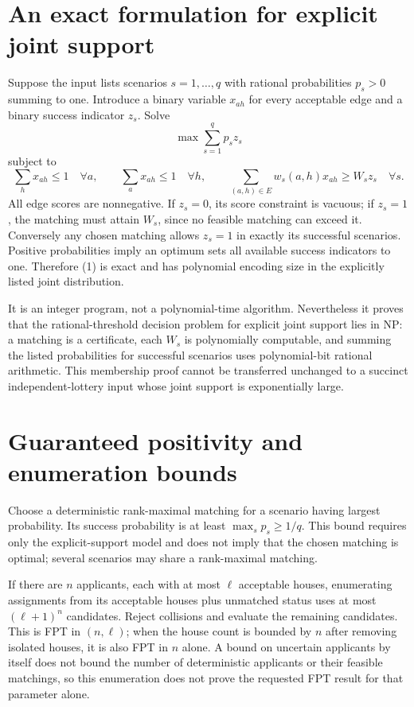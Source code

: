 \documentclass[11pt]{article}
\begin{document}
\section*{An exact formulation for explicit joint support}
Suppose the input lists scenarios $s=1,\ldots,q$ with rational probabilities $p_s>0$ summing to one. Introduce a binary variable $x_{ah}$ for every acceptable edge and a binary success indicator $z_s$. Solve
\[
 \max\sum_{s=1}^q p_sz_s
\]
subject to
\[
 \sum_hx_{ah}\leq1\quad\forall a,\qquad
 \sum_ax_{ah}\leq1\quad\forall h,\qquad
 \sum_{(a,h)\in E}w_s(a,h)x_{ah}\geq W_sz_s\quad\forall s.
                                                               \tag{1}
\]
All edge scores are nonnegative. If $z_s=0$, its score constraint is vacuous; if $z_s=1$, the matching must attain $W_s$, since no feasible matching can exceed it. Conversely any chosen matching allows $z_s=1$ in exactly its successful scenarios. Positive probabilities imply an optimum sets all available success indicators to one. Therefore (1) is exact and has polynomial encoding size in the explicitly listed joint distribution.

It is an integer program, not a polynomial-time algorithm. Nevertheless it proves that the rational-threshold decision problem for explicit joint support lies in NP: a matching is a certificate, each $W_s$ is polynomially computable, and summing the listed probabilities for successful scenarios uses polynomial-bit rational arithmetic. This membership proof cannot be transferred unchanged to a succinct independent-lottery input whose joint support is exponentially large.

\section*{Guaranteed positivity and enumeration bounds}
Choose a deterministic rank-maximal matching for a scenario having largest probability. Its success probability is at least $\max_sp_s\geq1/q$. This bound requires only the explicit-support model and does not imply that the chosen matching is optimal; several scenarios may share a rank-maximal matching.

If there are $n$ applicants, each with at most $\ell$ acceptable houses, enumerating assignments from its acceptable houses plus unmatched status uses at most $(\ell+1)^n$ candidates. Reject collisions and evaluate the remaining candidates. This is FPT in $(n,\ell)$; when the house count is bounded by $n$ after removing isolated houses, it is also FPT in $n$ alone. A bound on uncertain applicants by itself does not bound the number of deterministic applicants or their feasible matchings, so this enumeration does not prove the requested FPT result for that parameter alone.
\end{document}
